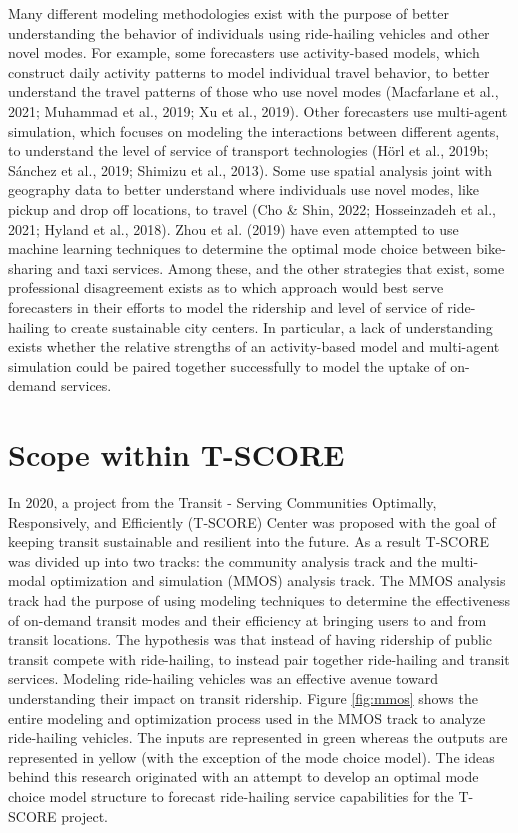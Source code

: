 \documentclass[fancy, masters]{byuthesis}
\begin{document}
Many different modeling methodologies exist with the purpose of better understanding the behavior of individuals using ride-hailing vehicles and other novel modes. For example, some forecasters use activity-based models, which construct daily activity patterns to model individual travel behavior, to better understand the travel patterns of those who use novel modes (Macfarlane et al., 2021; Muhammad et al., 2019; Xu et al., 2019). Other forecasters use multi-agent simulation, which focuses on modeling the interactions between different agents, to understand the level of service of transport technologies (Hörl et al., 2019b; Sánchez et al., 2019; Shimizu et al., 2013). Some use spatial analysis joint with geography data to better understand where individuals use novel modes, like pickup and drop off locations, to travel (Cho \& Shin, 2022; Hosseinzadeh et al., 2021; Hyland et al., 2018). Zhou et al. (2019) have even attempted to use machine learning techniques to determine the optimal mode choice between bike-sharing and taxi services. Among these, and the other strategies that exist, some professional disagreement exists as to which approach would best serve forecasters in their efforts to model the ridership and level of service of ride-hailing to create sustainable city centers. In particular, a lack of understanding exists whether the relative strengths of an activity-based model and multi-agent simulation could be paired together successfully to model the uptake of on-demand services.

\hypertarget{scope-within-t-score}{%
\section{Scope within T-SCORE}\label{scope-within-t-score}}

In 2020, a project from the Transit - Serving Communities Optimally, Responsively, and Efficiently (T-SCORE) Center was proposed with the goal of keeping transit sustainable and resilient into the future. As a result T-SCORE was divided up into two tracks: the community analysis track and the multi-modal optimization and simulation (MMOS) analysis track. The MMOS analysis track had the purpose of using modeling techniques to determine the effectiveness of on-demand transit modes and their efficiency at bringing users to and from transit locations. The hypothesis was that instead of having ridership of public transit compete with ride-hailing, to instead pair together ride-hailing and transit services. Modeling ride-hailing vehicles was an effective avenue toward understanding their impact on transit ridership. Figure \ref{fig:mmos} shows the entire modeling and optimization process used in the MMOS track to analyze ride-hailing vehicles. The inputs are represented in green whereas the outputs are represented in yellow (with the exception of the mode choice model). The ideas behind this research originated with an attempt to develop an optimal mode choice model structure to forecast ride-hailing service capabilities for the T-SCORE project.
\end{document}
